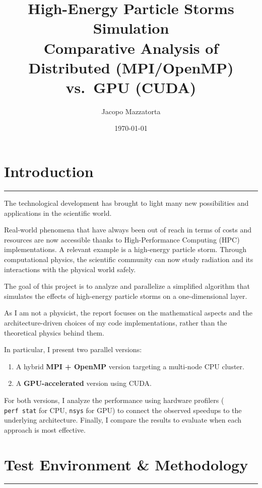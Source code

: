 \documentclass[10pt,dvipsnames,table,twocolumn]{article}
\title{High-Energy Particle Storms Simulation\\[0.2em]
{\large\color{MidInk} Comparative Analysis of Distributed (MPI/OpenMP) vs.\ GPU (CUDA)}}
\author{Jacopo Mazzatorta}
\date{\today}
\newcommand{\sectionrule}{\vspace{0.2em}\noindent\textcolor{PaleInk}{\rule{\columnwidth}{0.4pt}}\vspace{0.3em}}
\let\oldsection\section
\renewcommand{\section}[1]{\oldsection{#1}\sectionrule}
\let\oldtexttt\texttt
\renewcommand{\texttt}[1]{%
  {\small\colorbox{Mist}{\oldtexttt{\textcolor{DarkInk}{#1}}}}%
}
\begin{document}
\maketitle
\thispagestyle{plain}

\section{Introduction}\label{sec:intro}

The technological development has brought to light many new possibilities and applications in the scientific world.

Real-world phenomena that have always been out of reach in terms of costs and resources are now accessible thanks to High-Performance Computing (HPC) implementations. A relevant example is a high-energy particle storm. Through computational physics, the scientific community can now study radiation and its interactions with the physical world safely.

The goal of this project is to analyze and parallelize a simplified algorithm that simulates the effects of high-energy particle storms on a one-dimensional layer.

As I am not a physicist, the report focuses on the mathematical aspects and the architecture-driven choices of my code implementations, rather than the theoretical physics behind them.

In particular, I present two parallel versions:

\begin{enumerate}
  \item A hybrid \textbf{MPI + OpenMP} version targeting a multi-node CPU cluster.
  \item A \textbf{GPU-accelerated} version using CUDA.
\end{enumerate}

For both versions, I analyze the performance using hardware profilers (\texttt{perf~stat} for CPU, \texttt{nsys} for GPU) to connect the observed speedups to the underlying architecture. Finally, I compare the results to evaluate when each approach is most effective.


\section{Test Environment \& Methodology}\label{sec:method}
\end{document}
